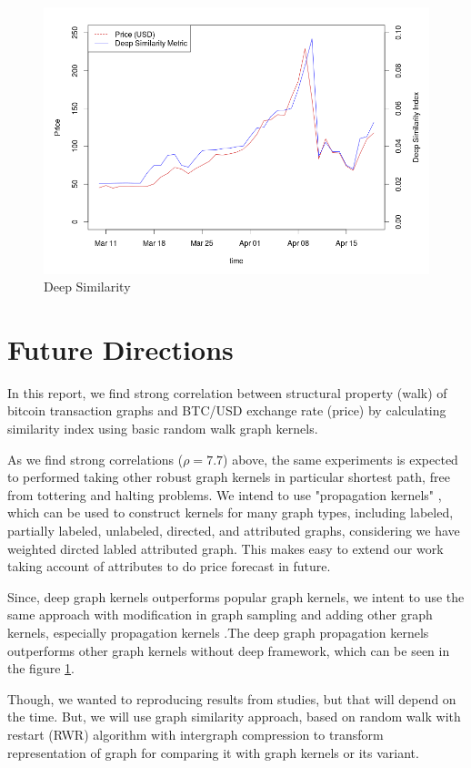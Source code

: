 \documentclass[12pt,a4paper]{article}
\numberwithin{equation}{section}
\numberwithin{figure}{section}
\numberwithin{table}{section}
\begin{document}
\begin{figure}[ht]
\begin{center}
\includegraphics[width=\textwidth]{./figure/ds.png}
\caption{Deep Similarity}
\label{fig:ds}
\end{center}
\end{figure}



\section{Future Directions}
\label{sec:con}

In this report, we find strong correlation between structural property (walk) of bitcoin transaction graphs and BTC/USD exchange rate (price) by calculating similarity index using basic random walk graph kernels\citep{Gartner2003, Kashima2003}. 

As we find strong correlations ($\rho =7.7$) above, the same experiments is expected to performed taking other robust graph kernels in particular shortest path, free from tottering and halting problems. We intend to use "propagation kernels" \citep{Neumann2015}, which can be used to construct kernels for many graph types, including labeled, partially labeled, unlabeled, directed, and attributed graphs, considering we have weighted dircted labled attributed graph. This makes easy to extend our work taking account of attributes to do price forecast in future. 

Since, \citep{Yanardag2015} deep graph kernels outperforms popular graph kernels, we intent to use the same approach with modification in graph sampling and adding other graph kernels, especially propagation kernels \citep{Neumann2015}.The deep graph propagation kernels outperforms other graph kernels without deep framework, which can be seen in the figure \ref{fig:ds}.

Though, we wanted to reproducing results from \citet{Kondor2014} studies, but that will depend on the time. But, we will  use \citet{Lee2015} graph similarity approach, based on random walk with restart (RWR) algorithm with intergraph compression to transform representation of graph for comparing it with graph kernels or its variant.


\newpage
 

\end{document}
